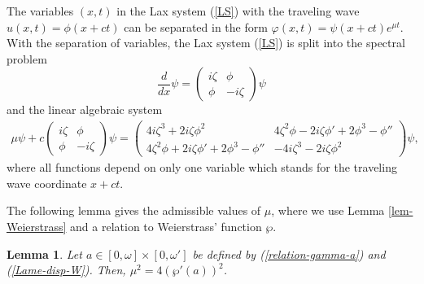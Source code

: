 \documentclass[12pt,reqno]{amsart}
\numberwithin{equation}{section}
\newtheorem{lemma}{Lemma}
\begin{document}
The variables $(x,t)$ in the Lax system (\ref{LS}) with the traveling wave $u(x,t) = \phi(x+ct)$ can be separated in the form 
$\varphi(x,t) = \psi(x+ct) e^{\mu t}$. With the separation of variables, the Lax system (\ref{LS}) is split into the spectral problem
\begin{equation}
\label{spectral}
\frac{d}{dx} \psi = \left(\begin{array}{ll} i\zeta & \phi \\ \phi  & -i\zeta\end{array} \right) \psi
\end{equation}
and the linear algebraic system
\begin{align}
\label{time}
\mu \psi + c \left(\begin{array}{ll} i\zeta & \phi \\ \phi  & -i\zeta\end{array} \right) \psi = \left( \begin{array}{ll} 4i\zeta^3+2i\zeta \phi^2 & 4\zeta^2 \phi - 2i\zeta \phi' +2\phi^3 - \phi'' \\ 4\zeta^2 \phi + 2i \zeta \phi' + 2 \phi^3 - \phi'' & -4i\zeta^3-2i\zeta \phi^2 \end{array}\right) \psi,
\end{align}
where all functions depend on only one variable which stands for the traveling wave coordinate $x+ct$. 

The following lemma gives the admissible values of $\mu$, where we use Lemma \ref{lem-Weierstrass} and a relation to Weierstrass' function $\wp$.

\begin{lemma}
\label{lem-polynomial}
Let $a \in [0,\omega] \times [0,\omega']$ be defined by (\ref{relation-gamma-a}) and (\ref{Lame-disp-W}). Then, $\mu^2 = 4 (\wp'(a))^2$.
\end{lemma}
\end{document}
